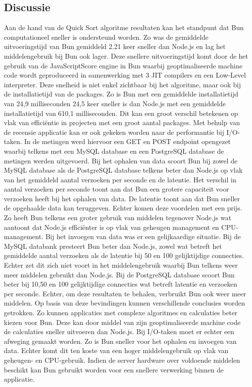 \subsection{Discussie}
Aan de hand van de Quick Sort algoritme resultaten kan het standpunt dat Bun computationeel sneller is ondersteund worden.
Zo was de gemiddelde uitvoeringstijd van Bun gemiddeld 2.21 keer sneller dan Node.js en lag het middelengebruik bij Bun ook lager. Deze snellere uitvoeringstijd komt door de
het gebruik van de JavaScriptScore engine in Bun waarbij geoptimaliseerde machine code wordt geproduceerd in 
samenwerking met 3 JIT compilers en een Low-Level interpreter.
Deze snelheid is niet enkel zichtbaar bij het algoritme, maar ook bij de installatietijd van de packages.
Zo is Bun met een gemiddelde installatietijd van 24,9 milliseconden 24,5 keer sneller is dan Node.js met een 
gemiddelde installatietijd van 610,1 milliseconden. Dit kan een groot verschil betekenen op vlak van efficiëntie in projecten 
met een groot aantal packages.
Met behulp van de recensie applicatie kan er ook gekeken worden naar de performantie bij I/O-taken.
In de metingen werd hiervoor een GET en POST endpoint opengezet waarbij telkens met een MySQL database en een PostgreSQL database de metingen werden uitgevoerd.
Bij het ophalen van data scoort Bun bij zowel de MySQL database als de PostgreSQL database telkens beter dan Node.js op vlak van het gemiddeld aantal verzoeken per seconde en de latentie.
Het verschil in aantal verzoeken per seconde toont aan dat Bun een grotere capaciteit voor verzoeken heeft bij het ophalen van data.
De latentie toont aan dat Bun sneller de opgehaalde data kan teruggeven. Echter komen deze voordelen met een prijs. 
Zo heeft Bun telkens een groter gebruik van middelen tegenover Node.js wat aantoont dat Node.js efficiënter is op vlak van geheugen management en CPU-management.
Bij het invoegen van data was er een gelijkaardige situatie. 
Bij de MySQL databank presteert Bun beter dan Node.js, zowel wat betreft het gemiddelde aantal verzoeken als de latentie 
bij 50 en 100 gelijktijdige connecties.
Echter zet dit zich niet voort in het middelengebruik waarbij Bun telkens weer meer middelen gebruikt dan Node.js.
Bij de PostgreSQL database scoort Bun beter bij 10,50 en 100 gelijktijdige connecties wat betreft latentie en verzoeken 
per seconde. Echter, om deze resultaten te behalen, verbruikt Bun ook weer meer middelen.
Op basis van deze bevindingen kunnen verschillende conclusies worden getrokken. 
Zo kunnen applicaties met complexe algoritmes en calculaties beter kiezen voor Bun. 
Deze kan door middel van zijn geoptimaliseerde machine code de calculaties sneller uitvoeren dan Node.js.
Bij I/O-taken moet er echter een afweging gemaakt worden. Zo is Bun sneller voor het ophalen en invoegen van data.
Echter komt dit ten koste van een hoger middelengebruik op vlak van geheugen- en CPU-gebruik. 
Indien de server hardware over voldoende middelen beschikt kan Bun gebruikt worden voor een snellere verwerking binnen de applicatie.

